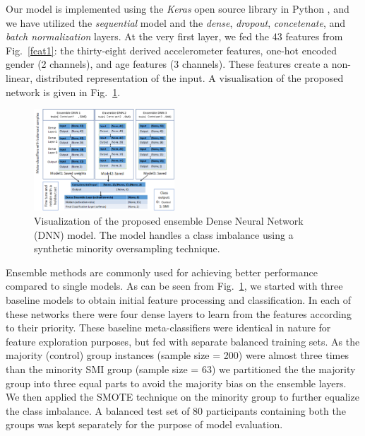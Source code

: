 \documentclass[letterpaper, 10pt, conference]{ieeeconf} %
\newcommand{\fig}[1]{Fig.~\ref{#1}}
\begin{document}
Our model is implemented using the \emph{Keras} open source library in Python \cite{ref:oCHO13}, and we have utilized the \emph{sequential} model and the \emph{dense}, \emph{dropout}, \emph{concetenate}, and \emph{batch normalization} layers. At the very first layer, we fed the 43 features from \fig{feat1}: the thirty-eight derived accelerometer features, one-hot encoded gender (2 channels), and age features (3 channels). These features create a non-linear, distributed representation of the input. A visualisation of the proposed network is given in \fig{fig:model}.
\begin{figure}
  \centering
  \includegraphics[width=0.47\textwidth]{images/modelArchitecture.png}
  \caption{Visualization of the proposed ensemble Dense Neural Network (DNN) model. The model handles a class imbalance using a synthetic minority oversampling technique.}
      \label{fig:model}
    \end{figure}

Ensemble methods are commonly used for achieving better performance compared to single models. As can be seen from \fig{fig:model}, we started with three baseline models to obtain initial feature processing and classification. In each of these networks there were four dense layers to learn from the features according to their priority. These baseline meta-classifiers were identical in nature for feature exploration purposes, but fed with separate balanced training sets. As the majority (control) group instances (sample size = 200) were almost three times than the minority SMI group (sample size = 63) we partitioned the the majority group into three equal parts to avoid the majority bias on the ensemble layers. We then applied the SMOTE technique on the minority group to further equalize the class imbalance. A balanced test set of 80 participants containing both the groups was kept separately for the purpose of model evaluation.
\end{document}

